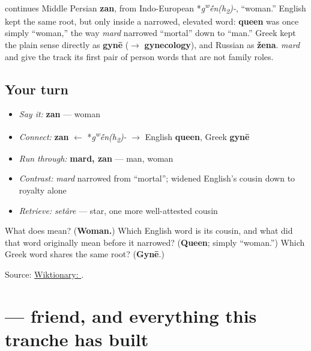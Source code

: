 \begin{cousinweb}
\textbf{} continues Middle Persian \textbf{zan}, from Indo-European *\emph{g\textsuperscript{w}\'{\={e}}n(h\textsubscript{2})-}, \textquotedblleft{}woman.\textquotedblright{} English kept the same root, but only inside a narrowed, elevated word: \textbf{queen} was once simply \textquotedblleft{}woman,\textquotedblright{} the way \emph{mard} narrowed \textquotedblleft{}mortal\textquotedblright{} down to \textquotedblleft{}man.\textquotedblright{} Greek kept the plain sense directly as \textbf{gynē} ($\to$ \textbf{gynecology}), and Russian as \textbf{žena}. \emph{mard} and \textbf{} give the track its first pair of person words that are not family roles.
\end{cousinweb}

\subsection*{Your turn}
\begin{itemize}
\raggedright
  \item \emph{Say it:} \textbf{zan} — woman
  \item \emph{Connect:} \textbf{zan} $\leftarrow$ *\emph{g\textsuperscript{w}\'{\={e}}n(h\textsubscript{2})-} $\to$ English \textbf{queen}, Greek \textbf{gynē}
  \item \emph{Run through:} \textbf{mard, zan} — man, woman
  \item \emph{Contrast:} \emph{mard} narrowed from \textquotedblleft{}mortal\textquotedblright{}; \textbf{} widened English's cousin down to royalty alone
  \item \emph{Retrieve:} \emph{setâre} — star, one more well-attested cousin
\end{itemize}

\begin{tcolorbox}[breakable,colback=teal!4,colframe=teal!35!black,title={Before you move on}]
What does \textbf{} mean? (\textbf{Woman.}) Which English word is its cousin, and what did that word originally mean before it narrowed? (\textbf{Queen}; simply \textquotedblleft{}woman.\textquotedblright{}) Which Greek word shares the same root? (\textbf{Gynē}.)

Source: \href{https://en.wiktionary.org/wiki/\%D8\%B2\%D9\%86}{Wiktionary: }.
\end{tcolorbox}
\section[\texorpdfstring{\fa{دوست} (dust)}{دوست (dust)}]{ — friend, and everything this tranche has built}

